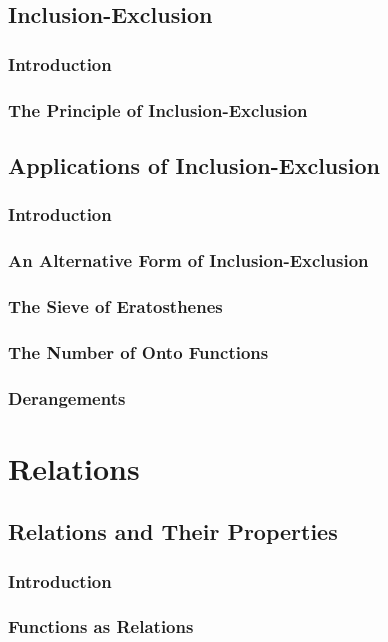 \documentclass[11pt]{book}
\begin{document}
 \section{Inclusion-Exclusion}
  \subsection{Introduction}
  \subsection{The Principle of Inclusion-Exclusion}
  
 \section{Applications of Inclusion-Exclusion}
  \subsection{Introduction}
  \subsection{An Alternative Form of Inclusion-Exclusion}
  \subsection{The Sieve of Eratosthenes}
  \subsection{The Number of Onto Functions}
  \subsection{Derangements}
 
\chapter{Relations}
 \section{Relations and Their Properties}
  \subsection{Introduction}
  \subsection{Functions as Relations}
\end{document}
